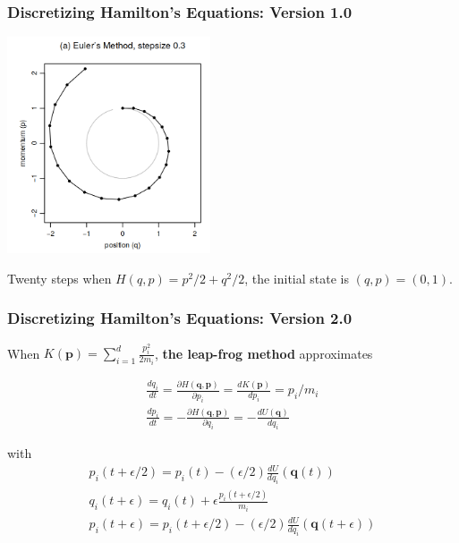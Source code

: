 \documentclass{beamer}
\begin{document}
\begin{frame}
\frametitle{Discretizing Hamilton's Equations: Version 1.0}

\begin{center}
\includegraphics[width=60mm]{eulers_method.png}
\end{center}

Twenty steps when $H(q,p) = p^2/2 + q^2/2$, the initial state is $(q,p) = (0,1)$. 

\end{frame}
\begin{frame}
\frametitle{Discretizing Hamilton's Equations: Version 2.0}

When $K(\mathbf{p})= \sum_{i=1}^d \frac{p_i^2}{2m_i}$, {\bf the leap-frog method} approximates

\begin{gather}
\frac{dq_i}{dt} = \frac{\partial H(\mathbf{q},\mathbf{p})}{\partial p_i} =  \frac{d K(\mathbf{p}) }{d p_i} = p_i/m_i  \\
\frac{dp_i}{dt} = -\frac{\partial H(\mathbf{q},\mathbf{p})}{\partial q_i} = -\frac{d U(\mathbf{q})}{d q_i} 
\end{gather}

with
\begin{gather}
p_i(t + \epsilon/2) =  p_i(t) - (\epsilon/2) \frac{d U}{d q_i}(\mathbf{q}(t)) \\
q_i(t + \epsilon) = q_i(t ) + \epsilon \frac{p_i(t+\epsilon/2)}{m_i} \\
p_i(t + \epsilon) =  p_i(t + \epsilon/2) - (\epsilon/2) \frac{d U}{d q_i}(\mathbf{q}(t+\epsilon)) 
\end{gather}


\end{frame}
\end{document}
